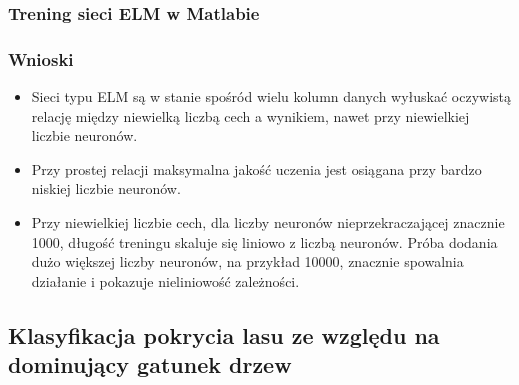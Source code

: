\documentclass{article}
\begin{document}
\subsubsection{Trening sieci ELM w Matlabie}
\subsubsection{Wnioski}
\begin{itemize}
\item Sieci typu ELM są w stanie spośród wielu kolumn danych wyłuskać oczywistą relację między niewielką liczbą cech a wynikiem, nawet przy niewielkiej liczbie neuronów.
\item Przy prostej relacji maksymalna jakość uczenia jest osiągana przy bardzo niskiej liczbie neuronów.
\item Przy niewielkiej liczbie cech, dla liczby neuronów nieprzekraczającej znacznie 1000, długość treningu skaluje się liniowo z liczbą neuronów. Próba dodania dużo większej liczby neuronów, na przykład 10000, znacznie spowalnia działanie i pokazuje nieliniowość zależności.
\end{itemize}
\subsection{Klasyfikacja pokrycia lasu ze względu na dominujący gatunek drzew}
\end{document}
